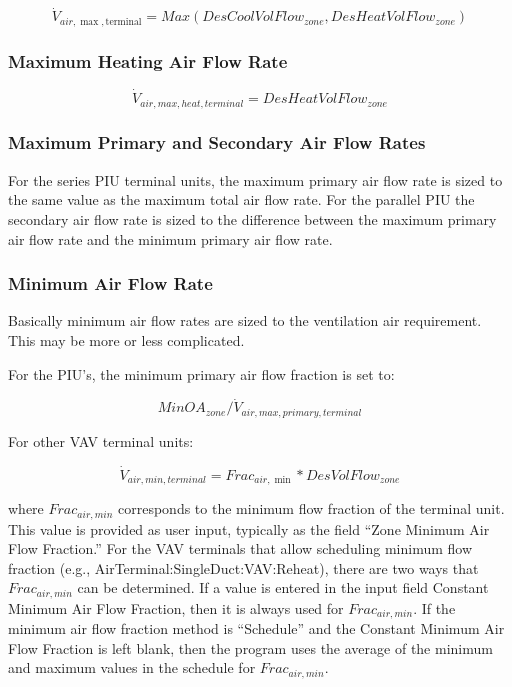 \begin{equation}
{\dot V_{air,\max ,{\mathrm{terminal}}}} = Max(DesCoolVolFlow_{zone},DesHeatVolFlow_{zone})
\end{equation}

\subsubsection{Maximum Heating Air Flow Rate}\label{maximum-heating-air-flow-rate}

\begin{equation}
{\dot V_{air,max,heat,terminal}} = DesHeatVolFlow_{zone}
\end{equation}

\subsubsection{Maximum Primary and Secondary Air Flow Rates}\label{maximum-primary-and-secondary-air-flow-rates}

For the series PIU terminal units, the maximum primary air flow rate is sized to the same value as the maximum total air flow rate. For the parallel PIU the secondary air flow rate is sized to the difference between the maximum primary air flow rate and the minimum primary air flow rate.

\subsubsection{Minimum Air Flow Rate}\label{minimum-air-flow-rate}

Basically minimum air flow rates are sized to the ventilation air requirement. This may be more or less complicated.

For the PIU's, the minimum primary air flow fraction is set to:

\begin{equation}
{MinOA}_{zone} /{\dot V_{air,max,primary,terminal}}
\end{equation}

For other VAV terminal units:

\begin{equation}
{\dot V_{air,min,terminal}} = Fra{c_{air,\min }}*DesVolFlow_{zone}
\end{equation}

where \emph{\(Frac_{air,min}\)} corresponds to the minimum flow fraction of the terminal unit. This value is provided as user input, typically as the field ``Zone Minimum Air Flow Fraction.'' For the VAV terminals that allow scheduling minimum flow fraction (e.g., AirTerminal:SingleDuct:VAV:Reheat), there are two ways that \emph{\(Frac_{air,min}\)} can be determined. If a value is entered in the input field Constant Minimum Air Flow Fraction, then it is always used for \emph{\(Frac_{air,min}\)}. If the minimum air flow fraction method is ``Schedule'' and the Constant Minimum Air Flow Fraction is left blank, then the program uses the average of the minimum and maximum values in the schedule for \emph{\(Frac_{air,min}\)}.

